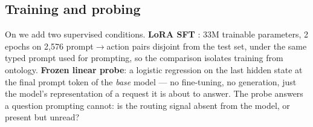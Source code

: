 \subsection{Training and probing}

On \qwen we add two supervised conditions. \textbf{LoRA SFT} \citep{hu2022lora}: 33M trainable parameters, 2 epochs on
2{,}576 prompt$\rightarrow$action pairs disjoint from the test set, under the same typed prompt used
for prompting, so the comparison isolates training from ontology. \textbf{Frozen linear probe}: a
logistic regression on the last hidden state at the final prompt token of the \emph{base} model ---
no fine-tuning, no generation, just the model's representation of a request it is about to answer.
The probe answers a question prompting cannot: is the routing signal absent from the model, or
present but unread?

